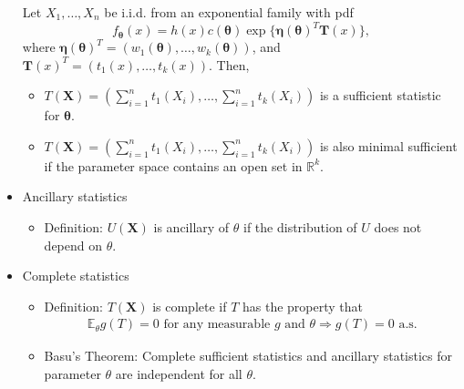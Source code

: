 \documentclass[12pt]{extarticle}
\newcommand{\X}{\mathbf X}
\newcommand{\E}{\mathbb E}
\begin{document}
\begin{itemize}
	Let $X_1,\ldots,X_n$ be i.i.d. from an exponential family with pdf $$f_{\bm\theta}(x) = h(x)c(\bm\theta)\exp \{\bm\eta(\bm\theta)^T\mathbf T(x) \},$$where $\bm\eta(\bm\theta)^T = (w_1(\bm\theta),\ldots,w_k(\bm\theta))$, and $\mathbf T(x)^T = (t_1(x),\ldots,t_k(x))$. Then,
	\begin{itemize}
		\item $T(\X) = \left(\sum_{i=1}^{n}t_1(X_i),\ldots, \sum_{i=1}^{n}t_k(X_i)\right)$ is a sufficient statistic for $\bm\theta$.
		\item $T(\X) = \left(\sum_{i=1}^{n}t_1(X_i),\ldots, \sum_{i=1}^{n}t_k(X_i)\right)$ is also minimal sufficient if the parameter space contains an open set in $\mathbb R^k$.
	\end{itemize}
	\item Ancillary statistics
\begin{itemize}
	\item Definition: $U(\mathbf{X})$ is ancillary of $\theta$ if the distribution of $U$ does not depend on $\theta$.
\end{itemize}
\item Complete statistics
\begin{itemize}
	\item Definition: $T(\mathbf{X})$ is complete if $T$ has the property that
	\begin{align*}
	\E_\theta g(T)=0 \text{  for any measurable } g \text{ and }\theta \Rightarrow g(T) =0 \text{ a.s.}
	\end{align*}
	\item Basu's Theorem: Complete sufficient statistics and ancillary statistics for parameter $\theta$ are independent for all $\theta.$
\end{itemize}
\end{itemize}
\end{document}
